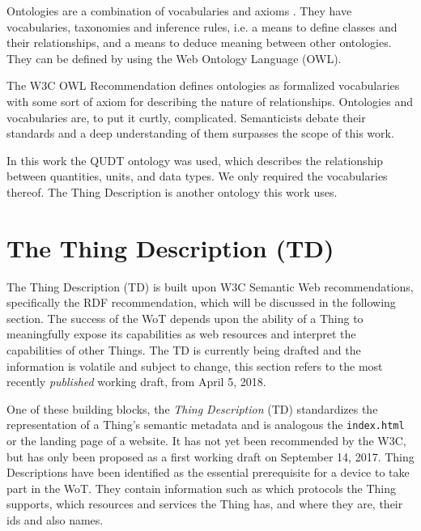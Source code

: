 Ontologies are a combination of vocabularies and axioms \cite{Cyganiak.2014}. They have vocabularies, taxonomies and inference rules, i.e. a means to define classes and their relationships, and a means to deduce meaning between other ontologies. \cite{berners2001semantic} They can be defined by using the Web Ontology Language (OWL).

The W3C OWL Recommendation defines ontologies as formalized vocabularies with some sort of axiom for describing the nature of relationships. \cite{Synak.2009}  Ontologies and vocabularies are, to put it curtly, complicated. Semanticists debate their standards and a deep understanding of them surpasses the scope of this work.

In this work the QUDT ontology was used, which describes the relationship between quantities, units, and data types. We only required the vocabularies thereof. The Thing Description is another ontology\cite{Charpenay.2016} this work uses.






\section{The Thing Description (TD)}
The Thing Description (TD) is built upon W3C Semantic Web recommendations, specifically the RDF recommendation, which will be discussed in the following section. The success of the WoT depends upon the ability of a Thing to meaningfully expose its capabilities as web resources and interpret the capabilities of other Things\cite{Charpenay.2016}. The TD is currently being drafted and the information is volatile and subject to change, this section refers to the most recently \textit{published} working draft, from April 5, 2018. 


One of these building blocks, the \textit{Thing Description} (TD) standardizes the representation of a Thing's semantic metadata and is analogous the \texttt{index.html} or the landing page of a website. It has not yet been recommended by the W3C, but has only been proposed as a first working draft on September 14, 2017. \cite{Kabisch.2017} 
Thing Descriptions have been identified as the essential prerequisite for a device to take part in the WoT\cite{Kazuo.2017}. They contain information such as which protocols the Thing supports, which resources and services the Thing has, and where they are, their ids and also names. 


